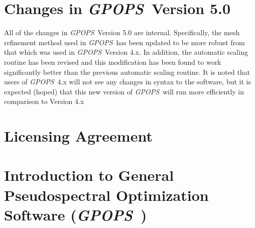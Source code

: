 \documentclass[10pt]{article}
\newcommand{\gpops}{{\em GPOPS}~}
\begin{document}
\section*{Changes in \gpops Version 5.0}

All of the changes in \gpops Version 5.0 are internal.  Specifically,
the mesh refinement method used in \gpops has been updated to be more
robust from that which was used in \gpops Version 4.x.  In addition,
the automatic scaling routine has been revised and this modification
has been found to work significantly better than the previous
automatic scaling routine.  It is noted that users of \gpops 4.x will
not see any changes in syntax to the software, but it is expected
(hoped) that this new version of \gpops will run more efficiently in
comparison to Version 4.x  

\section*{Licensing Agreement}



\clearpage
\setcounter{tocdepth}{2}
\tableofcontents

\clearpage

\section{Introduction to General Pseudospectral Optimization Software  (\gpops)}
\end{document}
